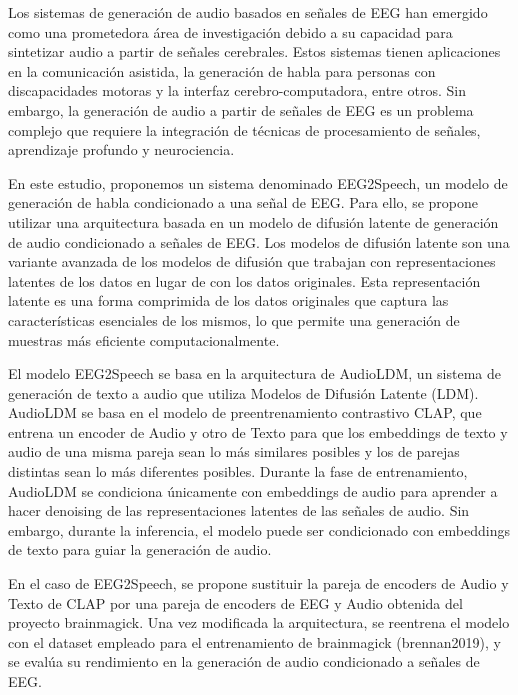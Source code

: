 Los sistemas de generación de audio basados en señales de EEG han emergido como una prometedora área de investigación debido a su capacidad para sintetizar audio a partir de señales cerebrales. Estos sistemas tienen aplicaciones en la comunicación asistida, la generación de habla para personas con discapacidades motoras y la interfaz cerebro-computadora, entre otros. Sin embargo, la generación de audio a partir de señales de EEG es un problema complejo que requiere la integración de técnicas de procesamiento de señales, aprendizaje profundo y neurociencia.

En este estudio, proponemos un sistema denominado EEG2Speech, un modelo de generación de habla condicionado a una señal de EEG. Para ello, se propone utilizar una arquitectura basada en un modelo de difusión latente de generación de audio condicionado a señales de EEG. Los modelos de difusión latente son una variante avanzada de los modelos de difusión que trabajan con representaciones latentes de los datos en lugar de con los datos originales. Esta representación latente es una forma comprimida de los datos originales que captura las características esenciales de los mismos, lo que permite una generación de muestras más eficiente computacionalmente.

El modelo EEG2Speech se basa en la arquitectura de AudioLDM, un sistema de generación de texto a audio que utiliza Modelos de Difusión Latente (LDM). AudioLDM se basa en el modelo de preentrenamiento contrastivo CLAP, que entrena un encoder de Audio y otro de Texto para que los embeddings de texto y audio de una misma pareja sean lo más similares posibles y los de parejas distintas sean lo más diferentes posibles. Durante la fase de entrenamiento, AudioLDM se condiciona únicamente con embeddings de audio para aprender a hacer denoising de las representaciones latentes de las señales de audio. Sin embargo, durante la inferencia, el modelo puede ser condicionado con embeddings de texto para guiar la generación de audio.

En el caso de EEG2Speech, se propone sustituir la pareja de encoders de Audio y Texto de CLAP por una pareja de encoders de EEG y Audio obtenida del proyecto brainmagick. Una vez modificada la arquitectura, se reentrena el modelo con el dataset empleado para el entrenamiento de brainmagick (brennan2019), y se evalúa su rendimiento en la generación de audio condicionado a señales de EEG.